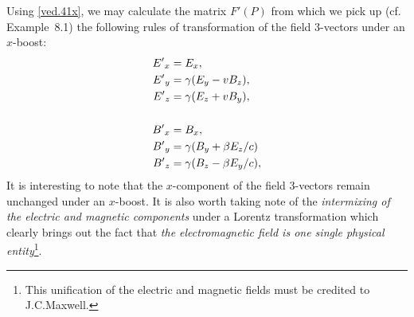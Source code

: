 Using \eqref{ved.41x}, we may calculate the matrix $ F'(P)$ 
from which we pick up (cf. Example~8.1) the following rules 
of transformation of the field  3-vectors under an 
$x$-boost:
\begin{align}\label{ved.42x}
{\ensuremath{E'}}_x &=E_x,\notag\\
{E'}_y &=\gamma(E_y - v B_z),\notag\\
{E'}_z &=\gamma(E_z + v B_y), \\ \notag\\
{B'}_x& =B_x,\notag\\
{B'}_y & =\gamma(B_y + {\beta} E_z/c) \notag\\
{B'}_z &=\gamma(B_z -{\beta} E_y/c ),\label{ved.43x}
\end{align}
It is interesting to note that the $x$-component of the 
field  3-vectors remain unchanged under an $x$-boost. It 
is also worth taking note of the \textsl{intermixing of the 
electric and magnetic components} under a Lorentz 
transformation  which clearly brings out the fact that 
\textsl{the electromagnetic field is one single physical 
entity}\footnote{This unification of the electric and 
magnetic fields must be credited to J.C.Maxwell.}.

